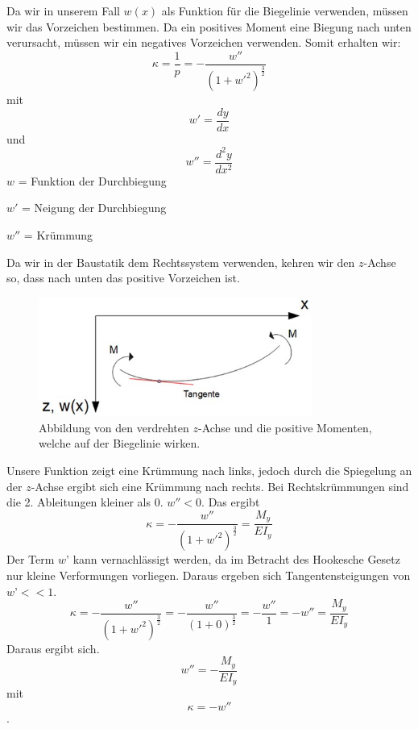 Da wir in unserem Fall $w(x)$ als Funktion für die Biegelinie verwenden, müssen wir das Vorzeichen bestimmen. Da ein positives Moment eine Biegung nach unten verursacht, müssen wir ein negatives Vorzeichen verwenden. Somit erhalten wir:
\begin{equation}
	\kappa=
	\frac{1}{p}=
	-\frac{w''}{\left(1+{w'}^2\right)^\frac{3}{2}}
\end{equation}
mit
\begin{equation}
	w'=
	\frac{dy}{dx} 
\end{equation}
und
\begin{equation}
	w''=
	\frac{d^2y}{dx^2}
\end{equation}
$w$ = Funktion der Durchbiegung

$w'$ = Neigung der Durchbiegung

$w''$ = Krümmung

Da wir in der Baustatik dem Rechtssystem verwenden, kehren wir den $z$-Achse so, dass nach unten das positive Vorzeichen ist.
\begin{figure}
\centering
	\includegraphics[width=0.8\textwidth]{papers/balken/images/teil2/BiegungverdrehteAchsen.jpg}
\caption{Abbildung von den verdrehten $z$-Achse und die positive Momenten, welche auf der Biegelinie wirken.}
\label{fig:Abbildung von den verdrehten $z$-Achse und die positive Momenten, welche auf der Biegelinie wirken.}
\end{figure}

Unsere Funktion zeigt eine Krümmung nach links, jedoch durch die Spiegelung an der $z$-Achse ergibt sich eine Krümmung nach rechts.
Bei Rechtskrümmungen sind die 2. Ableitungen kleiner als 0. $w'' < 0$.
Das ergibt
\begin{equation}
	\kappa=
	-\frac{w''}{\left(1+{w'}^2\right)^\frac{3}{2}}=
	\frac{M_y}{EI_y}
\end{equation}
Der Term $w’$ kann vernachlässigt werden, da im Betracht des Hookesche Gesetz nur kleine Verformungen vorliegen.
Daraus ergeben sich Tangentensteigungen von $w’ << 1$.
\begin{equation}
	\kappa=
	-\frac{w''}{\left(1+{w'}^2\right)^\frac{3}{2}}=
	-\frac{w''}{\left(1+0\right)^\frac{3}{2}}=
	-\frac{w''}{1}=-w''=
	\frac{M_y}{EI_y}
\end{equation}
Daraus ergibt sich.
\begin{equation}
	w''=
	-\frac{M_y}{EI_y}
\end{equation}
mit
\begin{equation}
	\kappa=
	-w''
\end{equation}.

